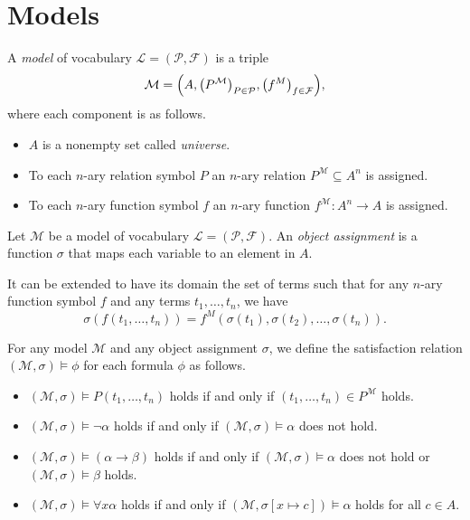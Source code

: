 \section{Models}
\begin{definition}
  A \emph{model} of vocabulary $\mathcal{L} = (\mathcal{P}, \mathcal{F})$
  is a triple
  \begin{equation*}
    \mathcal{M} =
    \Bigl(A, \bigl(P^\mathcal{M}\bigr)_{P \in \mathcal{P}},
    \bigl(f^M\bigr)_{f \in \mathcal{F}}\Bigr),
  \end{equation*}
  where each component is as follows.
  \begin{itemize}
    \item $A$ is a nonempty set called \emph{universe}.
    \item To each $n$-ary relation symbol $P$ an $n$-ary relation
    $P^\mathcal{M} \subseteq A^n$ is assigned.
    \item To each $n$-ary function symbol $f$ an $n$-ary function
    $f^\mathcal{M}: A^n \to A$ is assigned.
  \end{itemize}
\end{definition}

\begin{definition}
  Let $\mathcal{M}$ be a model of vocabulary $\mathcal{L} = (\mathcal{P},
  \mathcal{F})$.
  An \emph{object assignment} is a function $\sigma$ that maps each variable to
  an element in $A$.

  It can be extended to have its domain the set of terms such that for any
  $n$-ary function symbol $f$ and any terms $t_1, \dots, t_n$, we have
  \begin{equation*}
    \sigma(f(t_1, \dots, t_n))
    = f^M(\sigma(t_1), \sigma(t_2), \dots, \sigma(t_n)).
  \end{equation*}
\end{definition}

\begin{definition}
  For any model $\mathcal{M}$ and any object assignment $\sigma$, we define
  the satisfaction relation $(\mathcal{M}, \sigma) \vDash \phi$ for each
  formula $\phi$ as follows.
  \begin{itemize}
    \item $(\mathcal{M}, \sigma) \vDash P(t_1, \dots, t_n)$ holds if and only
    if $(t_1, \dots, t_n) \in P^\mathcal{M}$ holds.
    \item $(\mathcal{M}, \sigma) \vDash \neg\alpha$ holds if and only if
    $(\mathcal{M}, \sigma) \vDash \alpha$ does not hold.
    \item $(\mathcal{M}, \sigma) \vDash (\alpha \to \beta)$ holds if and only
    if $(\mathcal{M}, \sigma) \vDash \alpha$ does not hold or
    $(\mathcal{M}, \sigma) \vDash \beta$ holds.
    \item $(\mathcal{M}, \sigma) \vDash \forall x \alpha$ holds if and only if
    $(\mathcal{M}, \sigma[x \mapsto c]) \vDash \alpha$ holds for all $c \in A$.
  \end{itemize}
\end{definition}